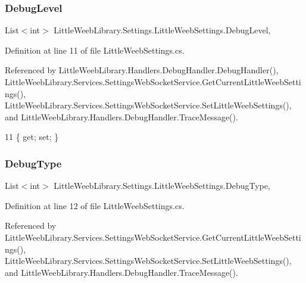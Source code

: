 \subsubsection{\texorpdfstring{Debug\+Level}{DebugLevel}}
{\footnotesize\ttfamily List$<$int$>$ Little\+Weeb\+Library.\+Settings.\+Little\+Weeb\+Settings.\+Debug\+Level\hspace{0.3cm}{\ttfamily [get]}, {\ttfamily [set]}}



Definition at line 11 of file Little\+Weeb\+Settings.\+cs.



Referenced by Little\+Weeb\+Library.\+Handlers.\+Debug\+Handler.\+Debug\+Handler(), Little\+Weeb\+Library.\+Services.\+Settings\+Web\+Socket\+Service.\+Get\+Current\+Little\+Weeb\+Settings(), Little\+Weeb\+Library.\+Services.\+Settings\+Web\+Socket\+Service.\+Set\+Little\+Weeb\+Settings(), and Little\+Weeb\+Library.\+Handlers.\+Debug\+Handler.\+Trace\+Message().


\begin{DoxyCode}
11 \{ \textcolor{keyword}{get}; \textcolor{keyword}{set}; \}
\end{DoxyCode}
\mbox{\label{class_little_weeb_library_1_1_settings_1_1_little_weeb_settings_a3e498a95757f135bc082566afbfa8877}} 
\subsubsection{\texorpdfstring{Debug\+Type}{DebugType}}
{\footnotesize\ttfamily List$<$int$>$ Little\+Weeb\+Library.\+Settings.\+Little\+Weeb\+Settings.\+Debug\+Type\hspace{0.3cm}{\ttfamily [get]}, {\ttfamily [set]}}



Definition at line 12 of file Little\+Weeb\+Settings.\+cs.



Referenced by Little\+Weeb\+Library.\+Services.\+Settings\+Web\+Socket\+Service.\+Get\+Current\+Little\+Weeb\+Settings(), Little\+Weeb\+Library.\+Services.\+Settings\+Web\+Socket\+Service.\+Set\+Little\+Weeb\+Settings(), and Little\+Weeb\+Library.\+Handlers.\+Debug\+Handler.\+Trace\+Message().



